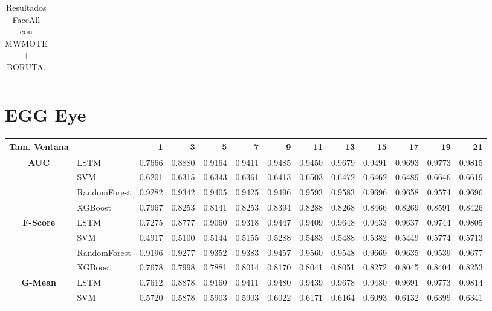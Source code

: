 \begin{table}[h]
\begin{adjustbox}{max width=11cm}
\begin{tabular}{|c|l|r|r|r|r|r|r|r|r|r|r|r|}
		\end{tabular}
	\end{adjustbox}
	\label{tab:faceAllMWMOTEBORUTA}
	\caption{Resultados FaceAll con MWMOTE + BORUTA.}
\end{table}

\newpage	
\section{EGG Eye}

\begin{table}[h]
	\centering
	\begin{adjustbox}{max width=15cm}
		\begin{tabular}{|c|l|r|r|r|r|r|r|r|r|r|r|r|}
			\hline
			\textbf{Tam. Ventana}&         &      1  &      3  &      5  &      7  &      9  &      11 &      13 &      15 &      17 &      19 &      21 \\
			\hline
			\textbf{AUC} & LSTM &  0.7666 &  0.8880 &  0.9164 &  0.9411 &  0.9485 &  0.9450 &  0.9679 &  0.9491 &  0.9693 &  0.9773 &  0.9815 \\
			& SVM &  0.6201 &  0.6315 &  0.6343 &  0.6361 &  0.6413 &  0.6503 &  0.6472 &  0.6462 &  0.6489 &  0.6646 &  0.6619 \\
			& RandomForest &  0.9282 &  0.9342 &  0.9405 &  0.9425 &  0.9496 &  0.9593 &  0.9583 &  0.9696 &  0.9658 &  0.9574 &  0.9696 \\
			& XGBoost &  0.7967 &  0.8253 &  0.8141 &  0.8253 &  0.8394 &  0.8288 &  0.8268 &  0.8466 &  0.8269 &  0.8591 &  0.8426 \\
			\hline
			\textbf{F-Score} & LSTM &  0.7275 &  0.8777 &  0.9060 &  0.9318 &  0.9447 &  0.9409 &  0.9648 &  0.9433 &  0.9637 &  0.9744 &  0.9805 \\
			& SVM &  0.4917 &  0.5100 &  0.5144 &  0.5155 &  0.5288 &  0.5483 &  0.5488 &  0.5382 &  0.5449 &  0.5774 &  0.5713 \\
			& RandomForest &  0.9196 &  0.9277 &  0.9352 &  0.9383 &  0.9457 &  0.9560 &  0.9548 &  0.9669 &  0.9635 &  0.9539 &  0.9677 \\
			& XGBoost &  0.7678 &  0.7998 &  0.7881 &  0.8014 &  0.8170 &  0.8041 &  0.8051 &  0.8272 &  0.8045 &  0.8404 &  0.8253 \\
			\hline
			\textbf{G-Mean} & LSTM &  0.7612 &  0.8878 &  0.9160 &  0.9411 &  0.9480 &  0.9439 &  0.9678 &  0.9480 &  0.9691 &  0.9773 &  0.9814 \\
			& SVM &  0.5720 &  0.5878 &  0.5903 &  0.5903 &  0.6022 &  0.6171 &  0.6164 &  0.6093 &  0.6132 &  0.6399 &  0.6341 \\

\end{tabular}
\end{adjustbox}
\end{table}
